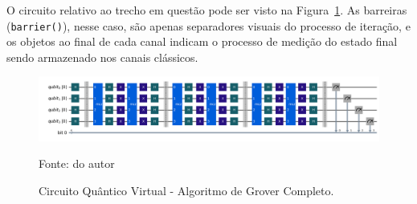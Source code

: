 O circuito relativo ao trecho em questão pode ser visto na Figura~\ref{fig: circuitoCompleto}. As barreiras (\texttt{barrier()}), nesse caso, são apenas separadores visuais do processo de iteração, e os objetos ao final de cada canal indicam o processo de medição do estado final sendo armazenado nos canais clássicos.

\begin{figure}[!thb]
    \centering
    \captionsetup{justification=centering}
    \caption{Circuito Quântico Virtual - Algoritmo de Grover Completo.}
    \label{fig: circuitoCompleto}
    
    \includegraphics[width=\linewidth]{Imagens/circuitoCompleto.png}

    \vspace{0.1em}
    {\small Fonte: do autor} 
\end{figure}